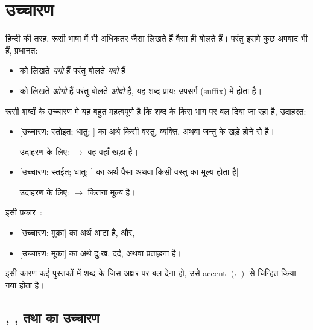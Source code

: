\section{उच्चारण}\label{sec:alpha-pronounce}
  हिन्दी की तरह, रूसी भाषा में भी अधिकतर जैसा लिखते हैं वैसा ही बोलते हैं। परंतु इसमे कुछ अपवाद भी हैं, प्रधानत:
  \begin{itemize}
    \item {} को लिखते \textit{यगो} हैं परंतु बोलते \textit{यवो} हैं
    \item {} को लिखते \textit{ओगो} हैं परंतु बोलते \textit{ओवो} हैं, यह शब्द प्राय: उपसर्ग (suffix) में होता है।

  \end{itemize}

  रूसी शब्दों के उच्चारण मे यह बहुत महत्वपूर्ण है कि शब्द के किस भाग पर बल दिया जा रहा है, उदाहरत:
  \begin{itemize}
    \item {} [उच्चारण: स्तोइत; धातु: ] का अर्थ किसी वस्तु, व्यक्ति, अथवा जन्तु के खड़े होने से
    है। \par उदाहरण के लिए:  $\rightarrow$ वह वहाँ खड़ा है।
    \item {} [उच्चारण: स्तईत; धातु: ] का अर्थ पैसा अथवा किसी वस्तु का मूल्य होता है| \par उदाहरण के लिए:  $\rightarrow$ कितना मूल्य है।
  \end{itemize}

  इसी प्रकार~\cite{levine_2009}:
  \begin{itemize}
    \item {} [उच्चारण: मुका] का अर्थ आटा है, और,
    \item {} [उच्चारण: मूका] का अर्थ दु:ख, दर्द, अथवा प्रताड़ना है।
  \end{itemize}

  इसी कारण कई पुस्तकों में शब्द के जिस अक्षर पर बल देना हो, उसे accent {\color{blue} {\large $\left( \acute{\,}\, \right)$}} से चिन्हित किया गया होता है। %

  \subsection{, , तथा  का उच्चारण}\label{subsec:alpha-pronounce-special-char}

